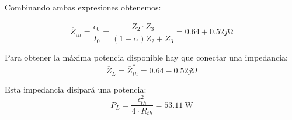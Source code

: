 Combinando ambas expresiones obtenemos:

\begin{equation*}
  \overline{Z}_{th} = \frac{\overline{\epsilon}_0}{\overline{I}_0} = \frac{\overline{Z}_2 \cdot \overline{Z}_3}{(1 + \alpha) \overline{Z}_2 + \overline{Z}_3} = 0.64 + 0.52j\si{\ohm}
\end{equation*}

Para obtener la máxima potencia disponible hay que conectar una impedancia:
\begin{equation*}
\overline{Z}_L = \overline{Z}^*_{th} = 0.64-0.52j\si{\ohm}
\end{equation*}

Esta impedancia disipará una potencia:
\begin{equation*}
P_L = \frac{\epsilon_{th}^2}{4 \cdot R_{th}} = \qty{53.11}{\watt}
\end{equation*}
  



